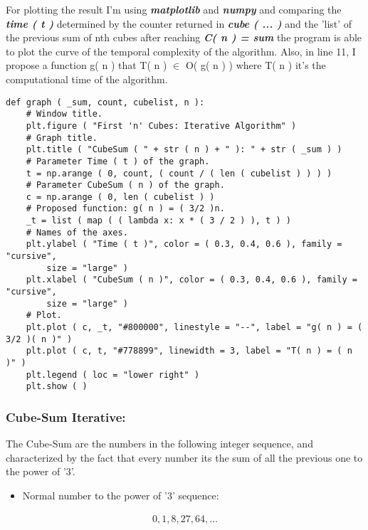 \documentclass[10pt,a4paper]{article}
\begin{document}
For plotting the result I’m using {\bfseries\itshape matplotlib} and {\bfseries\itshape numpy}  and comparing the {\bfseries\itshape time ( t )}  determined by the counter returned in {\bfseries\itshape cube ( ... )} and the ’list’ of the previous sum of nth cubes after reaching {\bfseries\itshape C( n ) = sum} the program is able to plot the curve of the temporal complexity of the algorithm. Also, in line 11, I propose a function g( n ) that T( n ) $\in$ O( g( n ) ) where T( n ) it's the computational time of the algorithm. \hfill \break

\begin{lstlisting}
def graph ( _sum, count, cubelist, n ):
    # Window title.
    plt.figure ( "First 'n' Cubes: Iterative Algorithm" )
    # Graph title.
    plt.title ( "CubeSum ( " + str ( n ) + " ): " + str ( _sum ) )
    # Parameter Time ( t ) of the graph.
    t = np.arange ( 0, count, ( count / ( len ( cubelist ) ) ) )
    # Parameter CubeSum ( n ) of the graph.
    c = np.arange ( 0, len ( cubelist ) )
    # Proposed function: g( n ) = ( 3/2 )n.
    _t = list ( map ( ( lambda x: x * ( 3 / 2 ) ), t ) )
    # Names of the axes.
    plt.ylabel ( "Time ( t )", color = ( 0.3, 0.4, 0.6 ), family = "cursive", 
    	size = "large" )
    plt.xlabel ( "CubeSum ( n )", color = ( 0.3, 0.4, 0.6 ), family = "cursive", 
    	size = "large" )
    # Plot.
    plt.plot ( c, _t, "#800000", linestyle = "--", label = "g( n ) = ( 3/2 )( n )" )
    plt.plot ( c, t, "#778899", linewidth = 3, label = "T( n ) = ( n )" )
    plt.legend ( loc = "lower right" )
    plt.show ( )
\end{lstlisting}

\pagebreak

\subsubsection{Cube-Sum Iterative:}

The Cube-Sum are the numbers in the following integer sequence, and characterized by the fact that every number its the sum of all the previous one to the power of '3'.

\begin{itemize}
\item Normal number to the power of '3' sequence:
\end{itemize}

\begin{ceqn}
\begin{align}
0, 1, 8, 27, 64, ...
\end{align}
\end{ceqn}
\end{document}

